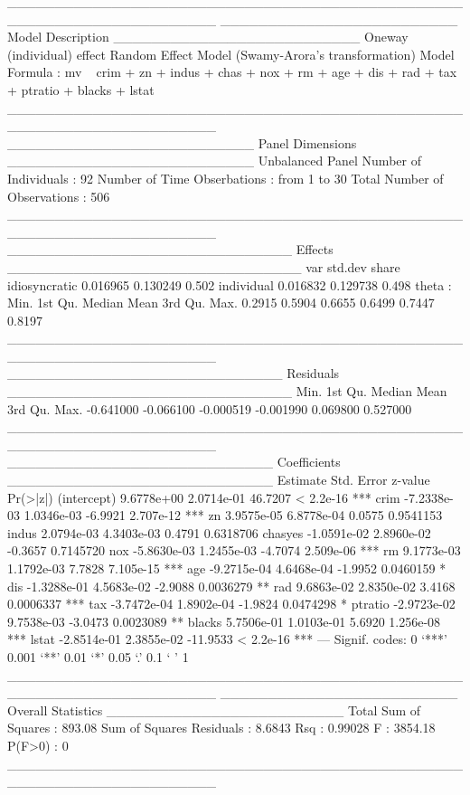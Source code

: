 \documentclass[a4paper]{article}
\begin{document}
\begin{Schunk}
\begin{Soutput}
______________________________________________________________________ 
_________________________ Model Description __________________________
Oneway (individual) effect
Random Effect Model (Swamy-Arora's transformation)
Model Formula             : mv ~ crim + zn + indus + chas + nox + 
                                rm + age + dis + rad + tax + 
                                ptratio + blacks + lstat
______________________________________________________________________ 
__________________________ Panel Dimensions __________________________
Unbalanced Panel
Number of Individuals        :  92
Number of Time Obserbations  :  from 1 to 30
Total Number of Observations :  506
______________________________________________________________________ 
______________________________ Effects _______________________________
                   var  std.dev share
idiosyncratic 0.016965 0.130249 0.502
individual    0.016832 0.129738 0.498
theta  : 
   Min. 1st Qu.  Median    Mean 3rd Qu.    Max. 
 0.2915  0.5904  0.6655  0.6499  0.7447  0.8197 
______________________________________________________________________ 
_____________________________ Residuals ______________________________
     Min.   1st Qu.    Median      Mean   3rd Qu.      Max. 
-0.641000 -0.066100 -0.000519 -0.001990  0.069800  0.527000 
______________________________________________________________________ 
____________________________ Coefficients ____________________________
               Estimate  Std. Error  z-value  Pr(>|z|)    
(intercept)  9.6778e+00  2.0714e-01  46.7207 < 2.2e-16 ***
crim        -7.2338e-03  1.0346e-03  -6.9921 2.707e-12 ***
zn           3.9575e-05  6.8778e-04   0.0575 0.9541153    
indus        2.0794e-03  4.3403e-03   0.4791 0.6318706    
chasyes     -1.0591e-02  2.8960e-02  -0.3657 0.7145720    
nox         -5.8630e-03  1.2455e-03  -4.7074 2.509e-06 ***
rm           9.1773e-03  1.1792e-03   7.7828 7.105e-15 ***
age         -9.2715e-04  4.6468e-04  -1.9952 0.0460159 *  
dis         -1.3288e-01  4.5683e-02  -2.9088 0.0036279 ** 
rad          9.6863e-02  2.8350e-02   3.4168 0.0006337 ***
tax         -3.7472e-04  1.8902e-04  -1.9824 0.0474298 *  
ptratio     -2.9723e-02  9.7538e-03  -3.0473 0.0023089 ** 
blacks       5.7506e-01  1.0103e-01   5.6920 1.256e-08 ***
lstat       -2.8514e-01  2.3855e-02 -11.9533 < 2.2e-16 ***
---
Signif. codes:  0 ‘***’ 0.001 ‘**’ 0.01 ‘*’ 0.05 ‘.’ 0.1 ‘ ’ 1 
______________________________________________________________________ 
_________________________ Overall Statistics _________________________
Total Sum of Squares       : 893.08
Sum of Squares Residuals   : 8.6843
Rsq                        : 0.99028
F                          : 3854.18
P(F>0)                     : 0
______________________________________________________________________ 
\end{Soutput}
\end{Schunk}
\end{document}
